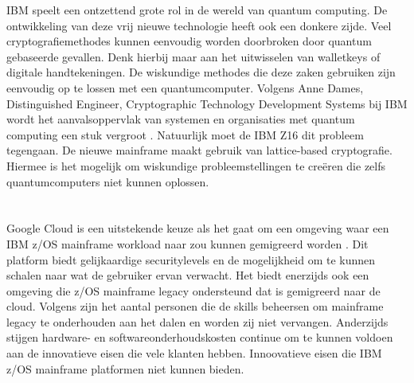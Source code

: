 IBM speelt een ontzettend grote rol in de wereld van quantum computing. De ontwikkeling van deze vrij nieuwe technologie heeft ook een donkere zijde. Veel cryptografiemethodes kunnen eenvoudig worden doorbroken door quantum gebaseerde gevallen. Denk hierbij maar aan het uitwisselen van walletkeys of digitale handtekeningen. De wiskundige methodes die deze zaken gebruiken zijn eenvoudig op te lossen met een quantumcomputer. Volgens Anne Dames, Distinguished Engineer, Cryptographic Technology Development Systems bij IBM wordt het aanvalsoppervlak van systemen en organisaties met quantum computing een stuk vergroot \autocite{Almekinders2022}. Natuurlijk moet de IBM Z16 dit probleem tegengaan. De nieuwe mainframe maakt gebruik van lattice-based cryptografie. Hiermee is het mogelijk om wiskundige probleemstellingen te creëren die zelfs quantumcomputers niet kunnen oplossen. 

\section{}
\label{sec:IBM Mainframe modernisatie}


\subsection{}
\label{sec:Workloads migreren naar de cloud}


Google Cloud is een uitstekende keuze als het gaat om een omgeving waar een IBM z/OS mainframe workload naar zou kunnen gemigreerd worden \autocite{Astadia2021}. Dit platform biedt gelijkaardige securitylevels en de mogelijkheid om te kunnen schalen naar wat de gebruiker ervan verwacht. Het biedt enerzijds ook een omgeving die z/OS mainframe legacy ondersteund dat is gemigreerd naar de cloud. Volgens \textcite{Astadia2021} zijn het aantal personen die de skills beheersen om mainframe legacy te onderhouden aan het dalen en worden zij niet vervangen. Anderzijds stijgen hardware- en softwareonderhoudskosten continue om te kunnen voldoen aan de innovatieve eisen die vele klanten hebben. Innoovatieve eisen die IBM z/OS mainframe platformen niet kunnen bieden. 

\subsection{}
\label{sec:Wat is Astadia?}

